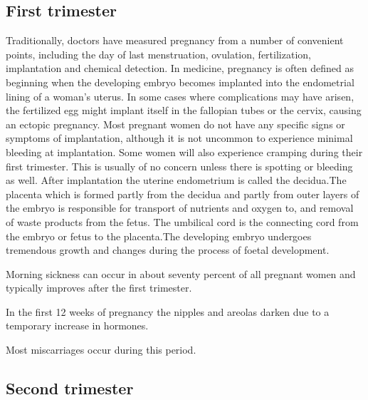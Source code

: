 \documentclass[12pt,a4paper,onecolumn]{article}
\begin{document}
\subsection{First trimester}
\begin{figwindow}
Traditionally, doctors have measured pregnancy from a number of convenient points, including the day
of last menstruation, ovulation, fertilization, implantation and chemical detection. In medicine,
pregnancy is often defined as beginning when the developing embryo becomes implanted into the
endometrial lining of a woman's uterus. In some cases where complications may have arisen, the
fertilized egg might implant itself in the fallopian tubes or the cervix, causing an ectopic
pregnancy. Most pregnant women do not have any specific signs or symptoms of implantation, although
it is not uncommon to experience minimal bleeding at implantation. Some women will also experience
cramping during their first trimester. This is usually of no concern unless there is spotting or
bleeding as well. After implantation the uterine endometrium is called the decidua.The placenta
which is formed partly from the decidua and partly from outer layers of the embryo is responsible
for transport of nutrients and oxygen to, and removal of waste products from the fetus. The
umbilical cord is the connecting cord from the embryo or fetus to the placenta.The developing embryo
undergoes tremendous growth and changes during the process of foetal development.
\end{figwindow}

Morning sickness can occur in about seventy percent of all pregnant women and typically improves
after the first trimester.

In the first 12 weeks of pregnancy the nipples and areolas darken due to a temporary increase in
hormones. 

Most miscarriages occur during this period.

\subsection{Second trimester}
\end{document}

